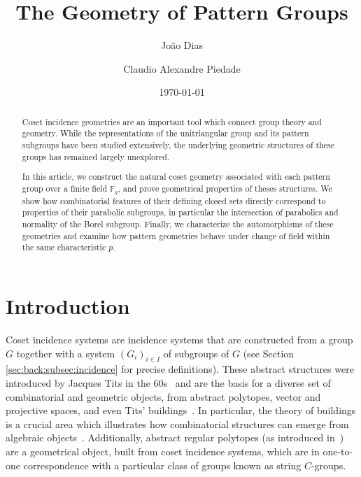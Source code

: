 \documentclass[11pt,letterpaper]{amsart}
\title{The Geometry of Pattern Groups}
\newcommand{\FF}{\mathbb{F}}
\begin{document}
\author[João Dias]{João Dias}
\address[João Dias]{Universidade de Évora, Escola de Ciências e Tecnologia, Departamento de Matemática, Centro de Investigacão em Matemática e Aplicacões
(CIMA), Orcid number 0000-0001-9400-7323
}


\author[Claudio Alexandre Piedade]{Claudio Alexandre Piedade}
\address[Claudio Alexandre Piedade]{Université Libre de Bruxelles, Brussels, Belgium, Orcid number 0000-0002-0746-5893
}





\date{\today}


\begin{abstract}
Coset incidence geometries are an important tool which connect group theory and geometry. While the representations of the unitriangular group and its pattern subgroups have been studied extensively, the underlying geometric structures of these groups has remained largely unexplored.

In this article, we construct the natural coset geometry associated with each pattern group over a finite field $\FF_q$, and prove geometrical properties of theses structures. We show how combinatorial features of their defining closed sets directly correspond to properties of their parabolic subgroups, in particular the intersection of parabolics and normality of the Borel subgroup. Finally, we characterize the automorphisms of these geometries and examine how pattern geometries behave under change of field within the same characteristic $p$.
\end{abstract}
    

\maketitle

\section{Introduction}

Coset incidence systems are incidence systems that are constructed from a group $G$ together with a system $(G_i)_{i\in I}$ of subgroups of $G$ (see Section \ref{sec:back:subsec:incidence} for precise definitions).
These abstract structures were introduced by Jacques Tits in the 60s~\cite{Tits1957,Tits1963geometries} and are the basis for a diverse set of combinatorial and geometric objects, from abstract polytopes, vector and projective spaces, and even Tits' buildings~\cite{Handbook,Tits1974,ARP}. In particular, the theory of buildings is a crucial area which 
illustrates how combinatorial structures can emerge from algebraic objects~\cite{Handbook,KenBrownBook2}. Additionally, abstract regular polytopes (as introduced in~\cite{ARP}) are a geometrical object, built from coset incidence systems, which are in one-to-one correspondence with a particular class of groups known as string $C$-groups.
\end{document}
